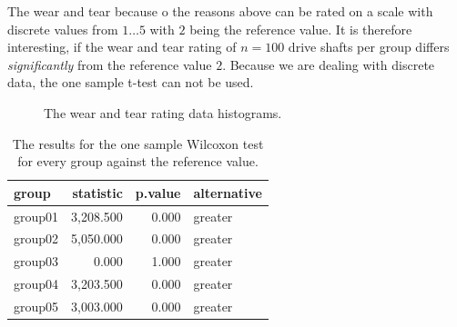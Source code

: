 \documentclass[
  a4paper,
]{scrbook}
\begin{document}
The wear and tear because o the reasons above can be rated on a scale
with discrete values from \(1 \ldots 5\) with \(2\) being the reference
value. It is therefore interesting, if the wear and tear rating of
\(n=100\) drive shafts per group differs \emph{significantly} from the
reference value \(2\). Because we are dealing with discrete data, the
one sample t-test can not be used.

\begin{figure}[ht]


\caption{\label{fig-wilcox-one-hist}The wear and tear rating data
histograms.}

\end{figure}%

\begin{longtable}[]{@{}lrrl@{}}

\caption{\label{tbl-wilcox-one-res}The results for the one sample
Wilcoxon test for every group against the reference value.}

\tabularnewline

\toprule\noalign{}
group & statistic & p.value & alternative \\
\midrule\noalign{}
\endhead
\bottomrule\noalign{}
\endlastfoot
{group01} & 3,208.500 & 0.000 & {greater} \\
{group02} & 5,050.000 & 0.000 & {greater} \\
{group03} & 0.000 & 1.000 & {greater} \\
{group04} & 3,203.500 & 0.000 & {greater} \\
{group05} & 3,003.000 & 0.000 & {greater} \\

\end{longtable}
\end{document}
